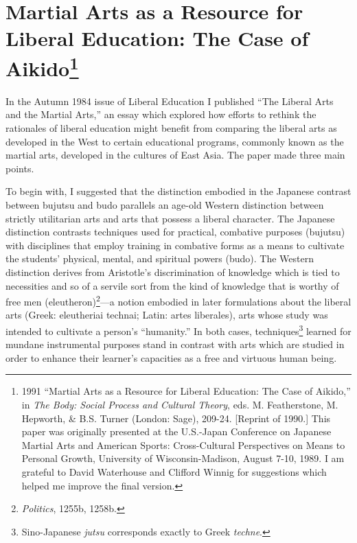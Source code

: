 \chapter[Martial Arts as a Resource for Liberal Education (1991)]{Martial Arts as a Resource for Liberal Education: The Case of Aikido\footnote{1991 ``Martial Arts as a Resource for Liberal Education: The Case of Aikido,'' in \emph{The Body: Social Process and Cultural Theory}, eds. M. Featherstone, M. Hepworth, \& B.S. Turner (London: Sage), 209-24. [Reprint of 1990.] This paper was originally presented at the U.S.-Japan Conference on Japanese Martial Arts and American Sports: Cross-Cultural Perspectives on Means to Personal Growth, University of Wisconsin-Madison, August 7-10, 1989. I am grateful to David Waterhouse and Clifford Winnig for suggestions which helped me improve the final version.}}

In the Autumn 1984 issue of Liberal Education I published ``The Liberal Arts and the Martial Arts,'' an essay which explored how efforts to rethink the rationales of liberal education might benefit from comparing the liberal arts as developed in the West to certain educational programs, commonly known as the martial arts, developed in the cultures of East Asia. The paper made three main points.

To begin with, I suggested that the distinction embodied in the Japanese contrast between bujutsu and budo parallels an age-old Western distinction between strictly utilitarian arts and arts that possess a liberal character. The Japanese distinction contrasts techniques used for practical, combative purposes (bujutsu) with disciplines that employ training in combative forms as a means to cultivate the students' physical, mental, and spiritual powers (budo). The Western distinction derives from Aristotle's discrimination of knowledge which is tied to necessities and so of a servile sort from the kind of knowledge that is worthy of free men (eleutheron)\footnote{\emph{Politics}, 1255b, 1258b.}---a notion embodied in later formulations about the liberal arts (Greek: eleutheriai technai; Latin: artes liberales), arts whose study was intended to cultivate a person's ``humanity.'' In both cases, techniques\footnote{Sino-Japanese \emph{jutsu} corresponds exactly to Greek \emph{techne}.} learned for mundane instrumental purposes stand in contrast with arts which are studied in order to enhance their learner's capacities as a free and virtuous human being. 

